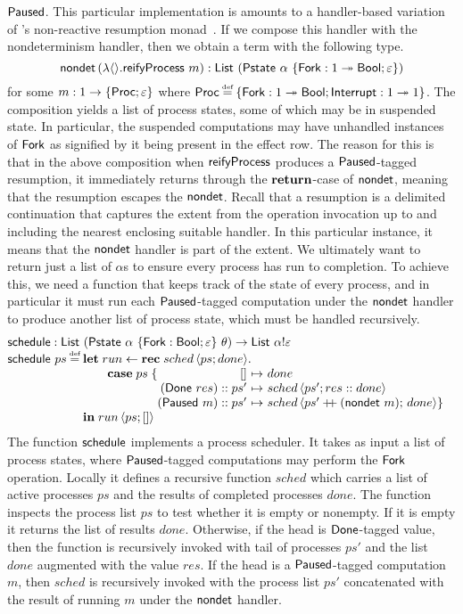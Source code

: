 \documentclass[12pt,phd,lfcs,twoside,openright,logo,leftchapter,normalheadings]{infthesis}
\theoremstyle{plain}
\theoremstyle{definition}
\begin{document}
$\mathsf{Paused}$.
%
This particular implementation is amounts to a handler-based variation
of \citeauthor{Harrison06}'s non-reactive resumption
monad~\cite{Harrison06}.
%
If we compose this handler with the nondeterminism
handler, then we obtain a term with the following type.
%
\[
  \mathsf{nondet}\,(\lambda\langle  \rangle.\mathsf{reifyProcess}~m) : \mathsf{List}~(\mathsf{Pstate}~\alpha~\{\mathsf{Fork}: 1 \twoheadrightarrow \mathsf{Bool};\varepsilon\})
\]
%
for some $m : 1 \to \{\mathsf{Proc};\varepsilon\}$ where
$\Proc \defas \{\Fork: \UnitType \opto \Bool;\Interrupt: \UnitType
\opto \UnitType\}$.
%
The composition yields a list of process states, some of which may be
in suspended state. In particular, the suspended computations may have
unhandled instances of $\mathsf{Fork}$ as signified by it being present in the
effect row. The reason for this is that in the above composition when
$\mathsf{reifyProcess}$ produces a $\mathsf{Paused}$-tagged resumption, it immediately
returns through the $\mathbf{return}$-case of $\mathsf{nondet}$, meaning that the
resumption escapes the $\mathsf{nondet}$. Recall that a resumption is a
delimited continuation that captures the extent from the operation
invocation up to and including the nearest enclosing suitable
handler. In this particular instance, it means that the $\mathsf{nondet}$
handler is part of the extent.
%
We ultimately want to return just a list of $\alpha$s to ensure every
process has run to completion. To achieve this, we need a function
that keeps track of the state of every process, and in particular it
must run each $\mathsf{Paused}$-tagged computation under the $\mathsf{nondet}$
handler to produce another list of process state, which must be
handled recursively.
%
\[
  \bl
    \schedule : \List~(\Pstate~\alpha~\{\Fork:\Bool;\varepsilon\}~\theta) \to \List~\alpha \eff \varepsilon\\
    \schedule~ps \defas
       \ba[t]{@{}l}
         \Let\;run \revto
             \Rec\;sched\,\Record{ps;done}.\\
              \qquad\Case\;ps\;\{
                  \ba[t]{@{}r@{~}c@{~}l}
                       \nil                  &\mapsto& done\\
                       (\Done~res) \cons ps' &\mapsto& sched\,\Record{ps';res \cons done}\\
                       (\Suspended~m) \cons ps' &\mapsto& sched\,\Record{ps' \concat (\nondet~m);\, done} \}
           \ea\\
           \In\;run\,\Record{ps;\nil}
       \ea
  \el
\]
%
The function $\mathsf{schedule}$ implements a process scheduler. It takes as
input a list of process states, where $\mathsf{Paused}$-tagged computations
may perform the $\mathsf{Fork}$ operation. Locally it defines a recursive
function $sched$ which carries a list of active processes $ps$ and the
results of completed processes $done$. The function inspects the
process list $ps$ to test whether it is empty or nonempty. If it is
empty it returns the list of results $done$. Otherwise, if the head is
$\mathsf{Done}$-tagged value, then the function is recursively invoked with
tail of processes $ps'$ and the list $done$ augmented with the value
$res$. If the head is a $\mathsf{Paused}$-tagged computation $m$, then
$sched$ is recursively invoked with the process list $ps'$
concatenated with the result of running $m$ under the $\mathsf{nondet}$
handler.
\end{document}
